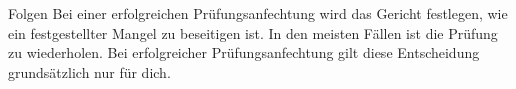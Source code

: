 \begin{artikel}{Folgen}
Bei einer erfolgreichen Prüfungsanfechtung wird das Gericht festlegen, wie ein festgestellter Mangel zu beseitigen ist. In den meisten Fällen ist die Prüfung zu wiederholen. Bei erfolgreicher Prüfungsanfechtung gilt diese Entscheidung grundsätzlich nur für dich.
\end{artikel}
